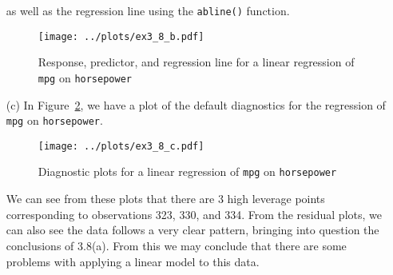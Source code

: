 \begin{itemize}
        as well as the regression line using the \verb|abline()| function.
        \begin{figure}[!ht]
            \texttt{[image: ../plots/ex3\_8\_b.pdf]}
            \caption{Response, predictor, and regression line for a linear regression
            of \\ \texttt{mpg} on \texttt{horsepower}\label{fig3_8reg}}
        \end{figure}
    \item[(c)] In Figure~\ref{fig3_8diag}, we have a plot of the default diagnostics
        for the regression of \verb|mpg| on \verb|horsepower|.
        \begin{figure}[!ht]
            \texttt{[image: ../plots/ex3\_8\_c.pdf]}
            \caption{Diagnostic plots for a linear regression of \texttt{mpg} on 
            \texttt{horsepower}\label{fig3_8diag}}
        \end{figure}
        We can see from these plots that there are 3 high leverage points corresponding
        to observations 323, 330, and 334. From the residual plots, we can also see 
        the data follows a very clear pattern, bringing into question the conclusions
        of 3.8(a). From this we may conclude that there are some problems with applying
        a linear model to this data.
        
\end{itemize}

